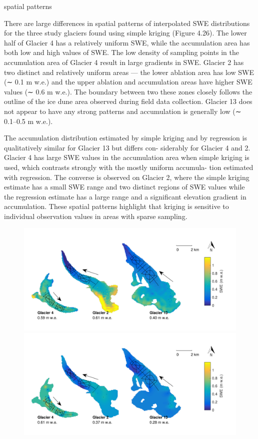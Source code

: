 \documentclass[twocolumn,letterpaper]{igs}
\begin{document}
spatial patterns

There are large differences in spatial patterns of interpolated SWE distributions for the three study glaciers found using simple kriging (Figure 4.26). The lower half of Glacier 4 has a relatively uniform SWE, while the accumulation area has both low and high values of SWE. The low density of sampling points in the accumulation area of Glacier 4 result in large gradients in SWE. Glacier 2 has two distinct and relatively uniform areas — the lower ablation area has low SWE (∼ 0.1 m w.e.) and the upper ablation and accumulation areas have higher SWE values (∼ 0.6 m w.e.). The boundary between two these zones closely follows the outline of the ice dune area observed during field data collection. Glacier 13 does not appear to have any strong patterns and accumulation is generally low (∼ 0.1–0.5 m w.e.).

The accumulation distribution estimated by simple kriging and by regression is qualitatively similar for Glacier 13 but differs con- siderably for Glacier 4 and 2. Glacier 4 has large SWE values in the accumulation area when simple kriging is used, which contrasts strongly with the mostly uniform accumula- tion estimated with regression. The converse is observed on Glacier 2, where the simple kriging estimate has a small SWE range and two distinct regions of SWE values while the regression estimate has a large range and a significant elevation gradient in accumulation. These spatial patterns highlight that kriging is sensitive to individual observation values in areas with sparse sampling.

\begin{figure}
	\centering
	\includegraphics[width =\textwidth]{LR_map.pdf}\\
    \includegraphics[width =\textwidth]{SK_map.pdf}\\
	\caption{}
	\label{fig:LR_SK_map}
\end{figure}
\end{document}

